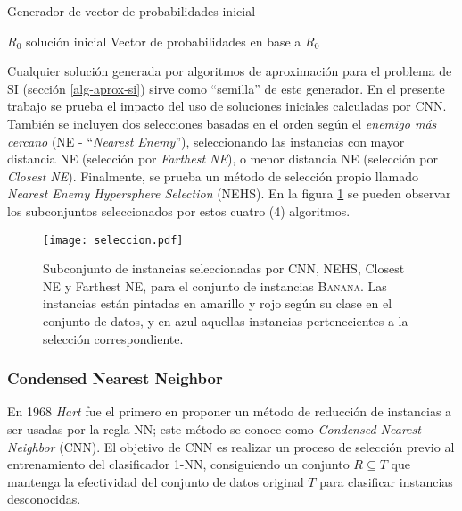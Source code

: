 \begin{algorithm}
\caption{Generador de vector de probabilidades inicial}
\label{inicial-sol-alg}
\begin{algorithmic}[1]

\Require $R_0$ solución inicial
\Ensure Vector de probabilidades en base a $R_0$

	\Else
	\EndIf
\EndFor
\State {}
\end{algorithmic}
\end{algorithm}

Cualquier solución generada por algoritmos de aproximación para el problema de SI (sección \ref{alg-aprox-si}) sirve como ``semilla'' de este generador. En el presente trabajo se prueba el impacto del uso de soluciones iniciales calculadas por CNN. También se incluyen dos selecciones basadas en el orden según el \emph{enemigo más cercano} (NE - ``\emph{Nearest Enemy}''), seleccionando las instancias con mayor distancia NE (selección por \emph{Farthest NE}), o menor distancia NE (selección por \emph{Closest NE}). Finalmente, se prueba un método de selección propio llamado \emph{Nearest Enemy Hypersphere Selection} (NEHS). En la figura \ref{seleccion} se pueden observar los subconjuntos seleccionados por estos cuatro (4) algoritmos.

\begin{figure}[h!]
\centering
\texttt{[image: seleccion.pdf]}
\caption[Algoritmos de Selección de Instancias]{Subconjunto de instancias seleccionadas por CNN, NEHS, Closest NE y Farthest NE, para el conjunto de instancias \textsc{Banana}. Las instancias están pintadas en amarillo y rojo según su clase en el conjunto de datos, y en azul aquellas instancias pertenecientes a la selección correspondiente.}
\label{seleccion}
\end{figure}

\subsubsection{Condensed Nearest Neighbor}

En 1968 \emph{Hart} \cite{Hart:2006:CNN:2263267.2267647} fue el primero en proponer un método de reducción de instancias a ser usadas por la regla NN; este método se conoce como \emph{Condensed Nearest Neighbor} (CNN). El objetivo de CNN es realizar un proceso de selección previo al entrenamiento del clasificador 1-NN, consiguiendo un conjunto $R \subseteq T$ que mantenga la efectividad del conjunto de datos original $T$ para clasificar instancias desconocidas.


